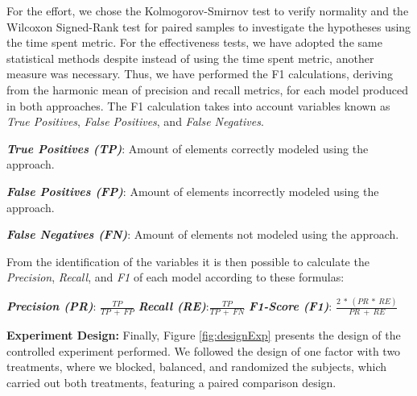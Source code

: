 For the effort, we chose the Kolmogorov-Smirnov test to verify normality and the Wilcoxon Signed-Rank test for paired samples to investigate the hypotheses using the time spent metric.
For the effectiveness tests, we have adopted the same statistical methods despite instead of using the time spent metric, another measure was necessary.
Thus, we have performed the F1 calculations, deriving from the harmonic mean of precision and recall metrics, for each model produced in both approaches.
The F1 calculation \cite{Derczynski:2016} takes into account variables known as \textit{True Positives}, \textit{False Positives}, and \textit{False Negatives}.
\begin{description}
    \item \textbf{\textit{True Positives (TP)}}: Amount of elements correctly modeled using the approach.
    \item \textbf{\textit{False Positives (FP)}}: Amount of elements incorrectly modeled using the approach. 
    \item \textbf{\textit{False Negatives (FN)}}: Amount of elements not modeled using the approach.
\end{description}
From the identification of the variables it is then possible to calculate the \textit{Precision}, \textit{Recall}, and \textit{F1} of each model according to these formulas:
\begin{description}
    \item \textbf{\textit{Precision (PR)}}: $\frac{TP}{TP~+~FP}$ 
    \hfill 
    \textbf{\textit{Recall (RE)}}:$\frac{TP}{TP~+~FN}$
    \hfill
    \textbf{\textit{F1-Score (F1)}}: $\frac{2~*~(PR~*~ RE)}{PR~+~RE}$
\end{description}

\textbf{Experiment Design:} Finally, Figure \ref{fig:designExp} presents the design of the controlled experiment performed. 
We followed the design of one factor with two treatments, where we blocked, balanced, and randomized the subjects, which carried out both treatments, featuring a paired comparison design.

